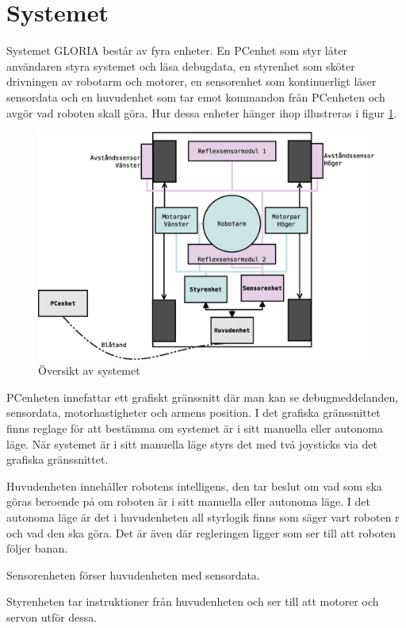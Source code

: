 
\section{Systemet}
Systemet GLORIA består av fyra enheter. En PCenhet som styr låter användaren styra systemet och läsa debugdata, en styrenhet som sköter drivningen av robotarm och motorer, en sensorenhet som kontinuerligt läser sensordata och en huvudenhet som tar emot kommandon från PCenheten och avgör vad roboten skall göra. Hur dessa enheter hänger ihop illustreras i figur \ref{system-oversikt}.

\begin{figure}[h!]
	\centering
	\includegraphics[scale=0.4]{grafik/system-oversikt}
	\caption{Översikt av systemet} \label{system-oversikt}
\end{figure}

PCenheten innefattar ett grafiskt gränssnitt där man kan se debugmeddelanden, sensordata, motorhastigheter och armens position. I det grafiska gränssnittet finns reglage för att bestämma om systemet är i sitt manuella eller autonoma läge. När systemet är i sitt manuella läge styrs det med två joysticks via det grafiska gränssnittet.

Huvudenheten innehåller robotens intelligens, den tar beslut om vad som ska göras beroende på om roboten är i sitt manuella eller autonoma läge. I det autonoma läge är det i huvudenheten all styrlogik finns som säger vart roboten r och vad den ska göra. Det är även där regleringen ligger som ser till att roboten följer banan.

Sensorenheten förser huvudenheten med sensordata.

Styrenheten tar instruktioner från huvudenheten och ser till att motorer och servon utför dessa.
